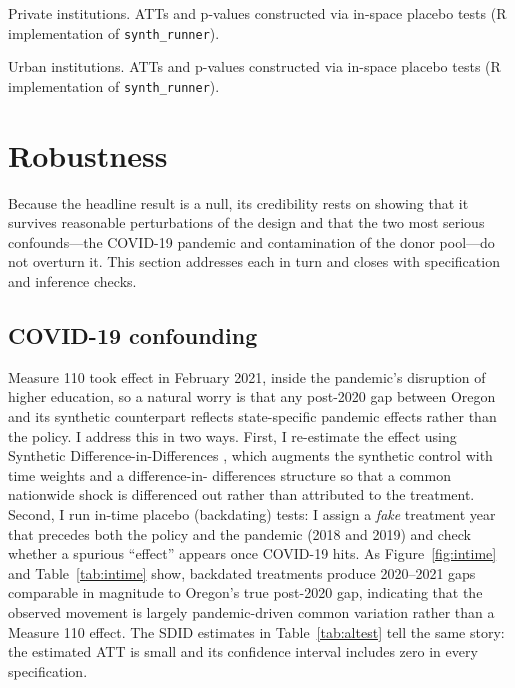 \documentclass[12pt]{article}
\begin{document}
\begin{table}[htbp]
\centering
\caption{ATTs and Associated P-Values, Private Institutions}
\label{tab:private}

\begin{minipage}{0.8\textwidth}
\vspace{4pt}
\footnotesize
Private institutions. ATTs and p-values constructed via in-space placebo
tests (R implementation of \texttt{synth\_runner}).
\end{minipage}
\end{table}

\begin{table}[htbp]
\centering
\caption{ATTs and Associated P-Values, Urban Institutions}
\label{tab:urban}

\begin{minipage}{0.8\textwidth}
\vspace{4pt}
\footnotesize
Urban institutions. ATTs and p-values constructed via in-space placebo
tests (R implementation of \texttt{synth\_runner}).
\end{minipage}
\end{table}

\section{Robustness}

Because the headline result is a null, its credibility rests on showing that
it survives reasonable perturbations of the design and that the two most
serious confounds---the COVID-19 pandemic and contamination of the donor
pool---do not overturn it. This section addresses each in turn and closes
with specification and inference checks.

\subsection{COVID-19 confounding}

Measure 110 took effect in February 2021, inside the pandemic's disruption of
higher education, so a natural worry is that any post-2020 gap between Oregon
and its synthetic counterpart reflects state-specific pandemic effects rather
than the policy. I address this in two ways. First, I re-estimate the effect
using Synthetic Difference-in-Differences \cite{arkhangelsky2021synthetic},
which augments the synthetic control with time weights and a difference-in-
differences structure so that a common nationwide shock is differenced out
rather than attributed to the treatment. Second, I run in-time placebo
(backdating) tests: I assign a \emph{fake} treatment year that precedes both
the policy and the pandemic (2018 and 2019) and check whether a spurious
``effect'' appears once COVID-19 hits. As Figure~\ref{fig:intime} and
Table~\ref{tab:intime} show, backdated treatments produce 2020--2021 gaps
comparable in magnitude to Oregon's true post-2020 gap, indicating that the
observed movement is largely pandemic-driven common variation rather than a
Measure 110 effect. The SDID estimates in Table~\ref{tab:altest} tell the
same story: the estimated ATT is small and its confidence interval includes
zero in every specification.
\end{document}
